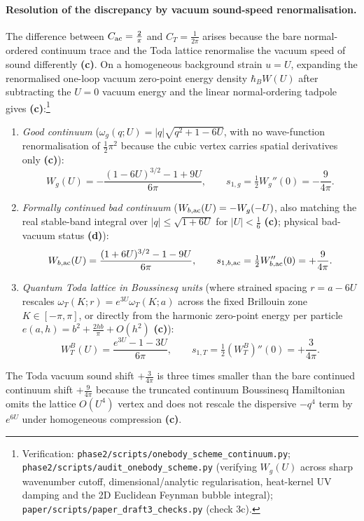 \documentclass[11pt,a4paper]{article}
\newcommand{\lab}[1]{{\normalfont\sffamily\footnotesize\bfseries(#1)}}
\newcommand{\Lc}{\lab{c}}
\newcommand{\Ld}{\lab{d}}
\newcommand{\scr}[1]{\nolinkurl{#1}}
\newcommand{\chk}[1]{\footnote{\raggedright Verification: #1.}}
\newcommand{\hb}{\hbar}
\theoremstyle{remark}
\begin{document}
\paragraph{Resolution of the discrepancy by vacuum sound-speed renormalisation.} The difference between $C_{\rm ac}=\frac2\pi$ and $C_T=\frac1{2\pi}$ arises because the bare normal-ordered continuum trace and the Toda lattice renormalise the vacuum speed of sound differently \Lc. On a homogeneous background strain $u=U$, expanding the renormalised one-loop vacuum zero-point energy density $\hb_B W(U)$ after subtracting the $U=0$ vacuum energy and the linear normal-ordering tadpole gives \Lc:\chk{\scr{phase2/scripts/onebody_scheme_continuum.py}; \scr{phase2/scripts/audit_onebody_scheme.py} (verifying $W_g(U)$ across sharp wavenumber cutoff, dimensional/analytic regularisation, heat-kernel UV damping and the 2D Euclidean Feynman bubble integral); \scr{paper/scripts/paper_draft3_checks.py} (check 3c)}
\begin{enumerate}
\item \emph{Good continuum} ($\omega_g(q;U)=|q|\sqrt{q^2+1-6U}$, with no wave-function renormalisation of $\tfrac12\pi^2$ because the cubic vertex carries spatial derivatives only \Lc):
\begin{equation}\label{eq:Wg}
W_g(U)=-\frac{(1-6U)^{3/2}-1+9U}{6\pi},\qquad
s_{1,g}=\tfrac12W_g''(0)=-\frac9{4\pi}.
\end{equation}
\item \emph{Formally continued bad continuum} ($W_{b,{\rm ac}}(U)=-W_g(-U)$, also matching the real stable-band integral over $|q|\le\sqrt{1+6U}$ for $|U|<\tfrac16$ \Lc; physical bad-vacuum status \Ld):
\begin{equation}\label{eq:Wbac}
W_{b,{\rm ac}}(U)=\frac{(1+6U)^{3/2}-1-9U}{6\pi},\qquad
s_{1,b,{\rm ac}}=\tfrac12W_{b,{\rm ac}}''(0)=+\frac9{4\pi}.
\end{equation}
\item \emph{Quantum Toda lattice in Boussinesq units} (where strained spacing $r=a-6U$ rescales $\omega_T(K;r)=e^{3U}\omega_T(K;a)$ across the fixed Brillouin zone $K\in[-\pi,\pi]$, or directly from the harmonic zero-point energy per particle $e(a,h)=b^2+\frac{2hb}{\pi}+O(h^2)$ \Lc):
\begin{equation}\label{eq:WTB}
W_T^B(U)=\frac{e^{3U}-1-3U}{6\pi},\qquad
s_{1,T}=\tfrac12(W_T^B)''(0)=+\frac3{4\pi}.
\end{equation}
\end{enumerate}
The Toda vacuum sound shift $+\frac3{4\pi}$ is three times smaller than the bare continued continuum shift $+\frac9{4\pi}$ because the truncated continuum Boussinesq Hamiltonian omits the lattice $O(U^4)$ vertex and does not rescale the dispersive $-q^4$ term by $e^{6U}$ under homogeneous compression \Lc.
\end{document}
